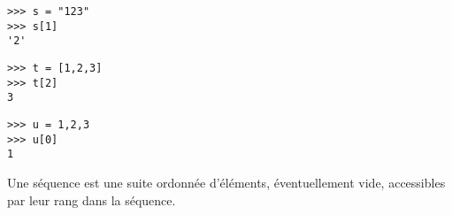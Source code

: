 \begin{py}{4cm}
\begin{verbatim}
>>> s = "123"
>>> s[1]
'2'
\end{verbatim}
\end{py}
\hfill
\begin{py}{4cm}
\begin{verbatim}
>>> t = [1,2,3]
>>> t[2]
3
\end{verbatim}
\end{py}
\hfill
\begin{py}{4cm}
\begin{verbatim}
>>> u = 1,2,3
>>> u[0]
1
\end{verbatim}
\end{py}

\begin{defin}[séquence]
Une séquence est une suite ordonnée d'éléments, éventuellement vide, 
accessibles par leur rang dans la séquence.
\end{defin}


